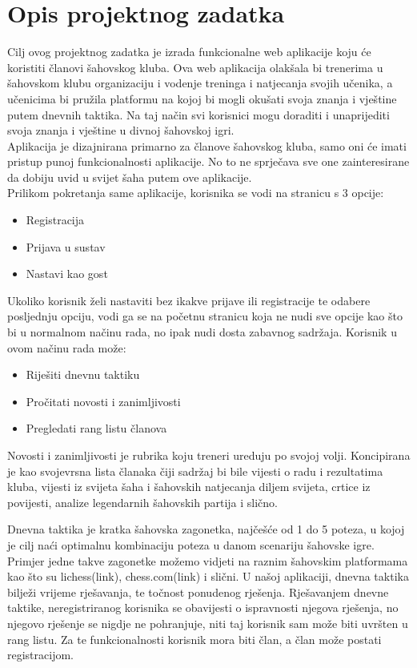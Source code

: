 \documentclass{article}
\begin{document}
	\section{Opis projektnog zadatka}
		Cilj ovog projektnog zadatka je izrada funkcionalne web aplikacije koju će koristiti članovi šahovskog kluba. Ova web aplikacija olakšala bi trenerima u šahovskom klubu organizaciju i vodenje treninga i natjecanja svojih učenika, a učenicima bi pružila platformu na kojoj bi mogli okušati svoja znanja i vještine putem dnevnih taktika. Na taj način svi korisnici mogu doraditi i unaprijediti svoja znanja i vještine u divnoj šahovskoj igri. \\ 
		Aplikacija je dizajnirana primarno za članove šahovskog kluba, samo oni će imati pristup punoj funkcionalnosti aplikacije. No to ne sprječava sve one zainteresirane da dobiju uvid u svijet šaha putem ove aplikacije. \\
		Prilikom pokretanja same aplikacije, korisnika se vodi na stranicu s 3 opcije:
		\begin{itemize}
			\item Registracija
			\item Prijava u sustav
			\item  Nastavi kao gost
		\end{itemize}
		Ukoliko korisnik želi nastaviti bez ikakve prijave ili registracije te odabere posljednju opciju, vodi ga se na početnu stranicu koja ne nudi sve opcije kao što bi u normalnom načinu rada, no ipak nudi dosta zabavnog sadržaja. Korisnik u ovom načinu rada može:
		\begin{itemize}
			\item Riješiti dnevnu taktiku 
			\item Pročitati novosti i zanimljivosti 
			\item Pregledati rang listu članova 
		\end{itemize}
		Novosti i zanimljivosti je rubrika koju treneri ureduju po svojoj volji. Koncipirana je kao svojevrsna lista članaka čiji sadržaj bi bile vijesti o radu i rezultatima kluba, vijesti iz svijeta šaha i šahovskih natjecanja diljem svijeta, crtice iz povijesti, analize legendarnih šahovskih partija i slično. 
		
		Dnevna taktika je kratka šahovska zagonetka, najčešće od 1 do 5 poteza, u kojoj je cilj naći optimalnu kombinaciju poteza u danom scenariju šahovske igre. Primjer jedne takve zagonetke možemo vidjeti na raznim šahovskim platformama kao što su lichess(link), chess.com(link) i slični. U našoj aplikaciji, dnevna taktika bilježi vrijeme rješavanja, te točnost ponudenog rješenja. Rješavanjem dnevne taktike, neregistriranog korisnika se obavijesti o ispravnosti njegova rješenja, no njegovo rješenje se nigdje ne pohranjuje, niti taj korisnik sam može biti uvršten u rang listu. Za te funkcionalnosti korisnik mora biti član, a član može postati registracijom.\\
		
\end{document}
